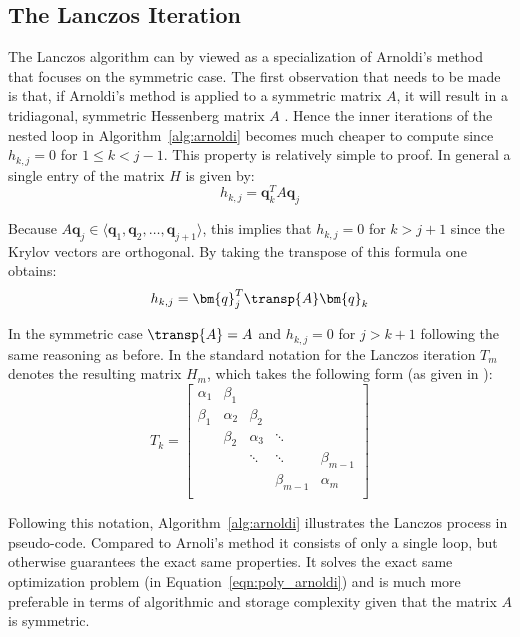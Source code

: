 \subsection{The Lanczos Iteration}
\label{sec:lanczos}

The Lanczos algorithm can by viewed as a specialization of Arnoldi's method that focuses on the symmetric case. The first observation that needs to be made is that, if Arnoldi's method is applied to a symmetric matrix $A$, it will result in a tridiagonal, symmetric Hessenberg matrix $A$ \cite{saad_gmres_1986}. Hence the inner iterations of the nested loop in Algorithm~\hyperref[alg:arnoldi]{\ref{alg:arnoldi}} becomes much cheaper to compute since $h_{k,j} = 0$ for $1 \leq k < j-1$. This property is relatively simple to proof. In general a single entry of the matrix $H$ is given by:
\begin{equation}
    h_{k,j}=\bm{q}_k^T A\bm{q}_j
\end{equation}

\noindent Because $A\bm{q}_j \in \langle \bm{q}_1,\bm{q}_2, \dots , \bm{q}_{j+1}\rangle $, this implies that $h_{k,j} = 0$ for $k>j+1$ since the Krylov vectors are orthogonal. By taking the transpose of this formula one obtains:
\begin{equation}
        h_{k,j}=\bm{q}_j^T \transp{A}\bm{q}_k
\end{equation}

\noindent In the symmetric case $\transp{A} = A$ and $h_{k,j} = 0$ for $j>k+1$ following the same reasoning as before. In the standard notation for the Lanczos iteration $T_m$ denotes the resulting matrix $H_m$, which takes the following form (as given in \cite{trefethen_numerical_1997}):
\begin{equation}
\label{eqn:lanczos}
   T_k = \left[
    \begin{array}{ccccc}
      \alpha_1 & \beta_1 & & & \\
      \beta_1 & \alpha_2 & \beta_2  & & \\
      & \beta_2 & \alpha_3 & \ddots  & \\
       & &\ddots &\ddots &\beta_{m-1} \\
       & & &\beta_{m-1} &\alpha_{m} \\
    \end{array}
  \right] 
\end{equation}

\noindent Following this notation, Algorithm~\hyperref[alg:arnoldi]{\ref{alg:arnoldi}} illustrates the Lanczos process in pseudo-code. Compared to Arnoli's method it consists of only a single loop, but otherwise guarantees the exact same properties. It solves the exact same optimization problem (in Equation~\hyperref[eqn:poly_arnoldi]{\ref{eqn:poly_arnoldi}}) and is much more preferable in terms of algorithmic and storage complexity given that the matrix $A$ is symmetric. 

